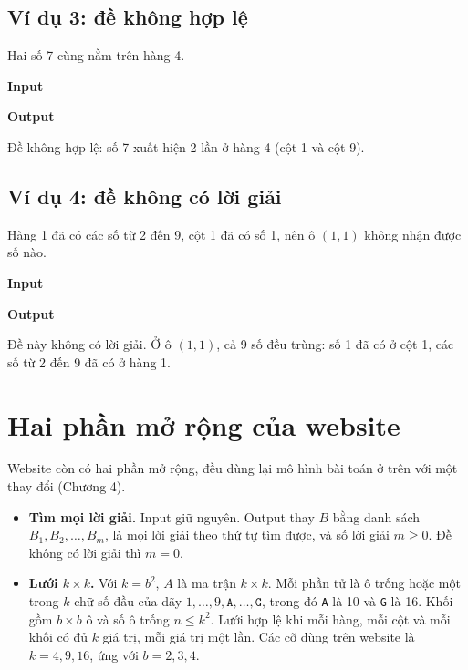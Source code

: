\subsection*{Ví dụ 3: đề không hợp lệ}

Hai số 7 cùng nằm trên hàng 4.

\begin{center}
  \begin{minipage}[t]{0.44\linewidth}
    \textbf{Input}
    
  \end{minipage}
  \hfill
  \begin{minipage}[t]{0.44\linewidth}
    \textbf{Output}\par\smallskip
    Đề không hợp lệ: số 7 xuất hiện 2 lần ở hàng 4 (cột 1 và cột 9).
  \end{minipage}
\end{center}

\subsection*{Ví dụ 4: đề không có lời giải}

Hàng 1 đã có các số từ 2 đến 9, cột 1 đã có số 1, nên ô \((1, 1)\) không nhận được số nào.

\begin{center}
  \begin{minipage}[t]{0.44\linewidth}
    \textbf{Input}
    
  \end{minipage}
  \hfill
  \begin{minipage}[t]{0.44\linewidth}
    \textbf{Output}\par\smallskip
    Đề này không có lời giải. Ở ô \((1, 1)\), cả 9 số đều trùng: số 1 đã có ở cột 1, các số từ 2 đến 9 đã có ở hàng 1.
  \end{minipage}
\end{center}

\section{Hai phần mở rộng của website}

Website còn có hai phần mở rộng, đều dùng lại mô hình bài toán ở trên với một thay đổi (Chương 4).

\begin{itemize}
  \item \textbf{Tìm mọi lời giải.} Input giữ nguyên. Output thay \(B\) bằng danh sách \(B_1, B_2, \ldots, B_m\), là mọi lời giải theo thứ tự tìm được, và số lời giải \(m \ge 0\). Đề không có lời giải thì \(m = 0\).
  \item \textbf{Lưới \(k \times k\).} Với \(k = b^2\), \(A\) là ma trận \(k \times k\). Mỗi phần tử là ô trống hoặc một trong \(k\) chữ số đầu của dãy \(1, \ldots, 9, \texttt{A}, \ldots, \texttt{G}\), trong đó \texttt{A} là 10 và \texttt{G} là 16. Khối gồm \(b \times b\) ô và số ô trống \(n \le k^2\). Lưới hợp lệ khi mỗi hàng, mỗi cột và mỗi khối có đủ \(k\) giá trị, mỗi giá trị một lần. Các cỡ dùng trên website là \(k = 4, 9, 16\), ứng với \(b = 2, 3, 4\).
\end{itemize}

